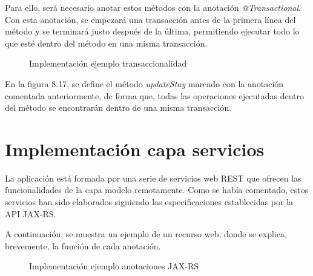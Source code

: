Para ello, será necesario anotar estos métodos con la anotación \textit{@Transactional}. Con esta anotación, se empezará una transacción antes de la primera línea del método y se terminará justo después de la última, permitiendo ejecutar todo lo que esté dentro del método en una misma transacción.

\begin{figure}[H]
\centering
{}
\caption{Implementación ejemplo transaccionalidad}
\end{figure}

En la figura 8.17, se define el método \textit{updateStay} marcado con la anotación comentada anteriormente, de forma que, todas las operaciones ejecutadas dentro del método se encontrarán dentro de una misma transacción. 


\section{Implementación capa servicios}
La aplicación está formada por una serie de servicios web REST que ofrecen las funcionalidades de la capa modelo remotamente. Como se había comentado, estos servicios han sido elaborados siguiendo las especificaciones establecidas por la API JAX-RS.

A continuación, se muestra un ejemplo de un recurso web, donde se explica, brevemente, la función de cada anotación.


\begin{figure}[H]
\centering
{}
\caption{Implementación ejemplo anotaciones JAX-RS}
\end{figure}

